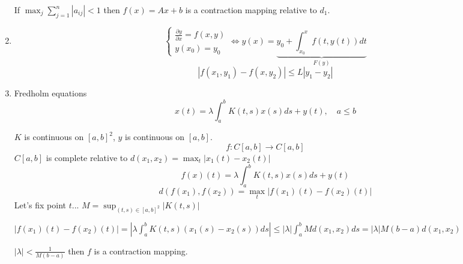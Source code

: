 \begin{enumerate}
        If $\max_j \sum_{j=1}^{n} \left| a_{ij} \right| < 1$ then $f(x) = Ax + b$ is a contraction mapping relative to $d_1$.


  \item
  \[ \begin{cases}
    \frac{\partial y}{\partial x} = f(x,y)\\
    y(x_0) = y_0
  \end{cases} \iff
  y(x) = \underbrace{y_0 + \int_{x_0}^{x} f(t,y(t)) dt }_{F(y)}
\] 
  \[ \left| f(x_1, y_1) - f(x, y_2) \right|  \le  L \left| y_1 - y_2 \right|  \] 

  \item Fredholm equations
    \[ x(t) = \lambda \int_{a}^{b} K(t,s) x(s)ds + y(t), \quad a \le b  \] 

    $K$ is continuous on $[a,b]^2$, $y$ is continuous on $[a,b]$.
    \[ f: C[a,b] \to  C[a,b] \] 
    $C[a,b]$ is complete relative to $d(x_1, x_2) = \max_t \left| x_1(t) - x_2(t) \right| $
     \[ f(x)(t) = \lambda \int_{a}^{b} K(t,s) x(s)ds + y(t)  \] 
     \[ d(f(x_1), f(x_2)) = \max_t \left| f(x_1)(t) - f(x_2)(t) \right|  \] 
     Let's fix point $t$...
     $M = \sup_{(t,s) \in  [a,b]^2} \left| K(t,s) \right| $ 

     $\left| f(x_1)(t) - f(x_2)(t) \right| = \left| \lambda \int_{a}^{b} K(t,s)(x_1(s) - x_2(s))ds  \right|  \le \left| \lambda  \right| \int_{a}^{b} M d(x_1,x_2) ds = \left| \lambda  \right| M(b-a) d(x_1, x_2)  $

     $\left| \lambda  \right| < \frac{1}{M(b-a)}$ then $f$ is a contraction mapping.
   
\end{enumerate}






